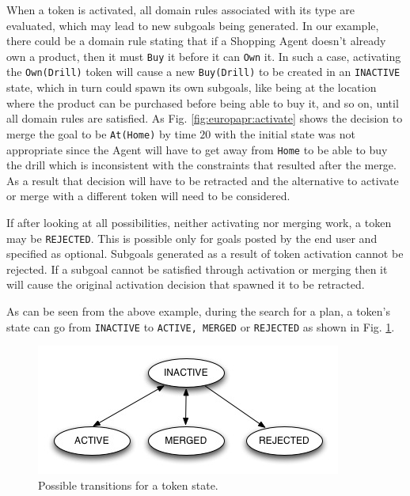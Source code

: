 \begin{description}
When a token is activated, all domain rules associated with its type
are evaluated, which may lead to new subgoals being generated. In our
example, there could be a domain rule stating that if a Shopping Agent
doesn't already own a product, then it must \texttt{Buy} it before it
can \texttt{Own} it. In such a case, activating the
\texttt{Own(Drill)} token will cause a new \texttt{Buy(Drill)} to be
created in an \texttt{INACTIVE} state, which in turn could spawn its
own subgoals, like being at the location where the product can be
purchased before being able to buy it, and so on, until all domain
rules are satisfied. As Fig. \ref{fig:europapr:activate} shows the
decision to merge the goal to be \texttt{At(Home)} by time $20$ with
the initial state was not appropriate since the Agent will have to get
away from \texttt{Home} to be able to buy the drill which is
inconsistent with the constraints that resulted after the merge. As a
result that decision will have to be retracted and the alternative to
activate or merge with a different token will need to be considered.

If after looking at all possibilities, neither activating nor merging
work, a token may be \texttt{REJECTED}. This is possible only for
goals posted by the end user and specified as optional. Subgoals
generated as a result of token activation cannot be rejected. If a
subgoal cannot be satisfied through activation or merging then it will
cause the original activation decision that spawned it to be
retracted.

As can be seen from the above example, during the search for a plan, a
token's state can go from \texttt{INACTIVE} to \texttt{ACTIVE, MERGED}
or \texttt{REJECTED} as shown in Fig. \ref{fig:europapr:states}.

\begin{figure} \centering
  \includegraphics[scale=3.9]{figs/europa-pr-states.jpeg}
  \caption{\small Possible transitions for a token state.}
\label{fig:europapr:states}
\end{figure}



\end{description}

